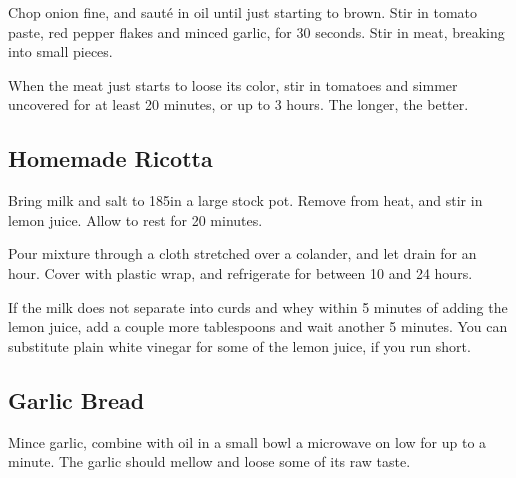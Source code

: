 \begin{recipe}
Chop onion fine, and sauté in oil until just starting to brown. Stir in tomato paste, red pepper flakes and minced garlic, for 30 seconds. Stir in meat, breaking into small pieces.

When the meat just starts to loose its color, stir in tomatoes and simmer uncovered for at least 20 minutes, or up to 3 hours. The longer, the better.

\clearpage

\subsection{Homemade Ricotta}



Bring milk and salt to 185\degree in a large stock pot. Remove from heat, and stir in lemon juice. Allow to rest for 20 minutes.

Pour mixture through a cloth stretched over a colander, and let drain for an hour. Cover with plastic wrap, and refrigerate for between 10 and 24 hours.

If the milk does not separate into curds and whey within 5 minutes of adding the lemon juice, add a couple more tablespoons and wait another 5 minutes. You can substitute plain white vinegar for some of the lemon juice, if you run short.

\subsection{Garlic Bread}



Mince garlic, combine with oil in a small bowl a microwave on low for up to a minute. The garlic should mellow and loose some of its raw taste.


\end{recipe}
